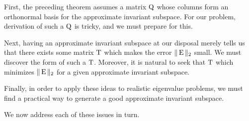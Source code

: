 First, the preceding theorem assumes a matrix $\operatorname{Q}$ whose columns form an
orthonormal basis for the approximate invariant subspace. For our problem, 
derivation of such a $\operatorname{Q}$ is tricky, and we must prepare for this. 

Next, having an approximate invariant subspace at our disposal merely tells us
that there exists some matrix $\operatorname{T}$ which makes the error 
%
%
%
%
$\|\operatorname{E}\|_2$ small. We must discover the form of such a $\operatorname{T}$. Moreover, it is
natural to seek that $\operatorname{T}$ which minimizes $\|\operatorname{E}\|_2$ for a given approximate
invariant subspace. 

Finally, in order to apply these ideas to realistic eigenvalue problems, we must
find a practical way to generate %
a good approximate invariant subspace. 

We now address each of these issues in turn.

